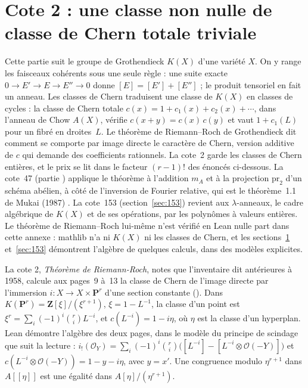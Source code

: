 \section[Cote 2 : une classe non nulle de classe de Chern totale triviale]{Cote 2 : une classe non nulle de classe de Chern totale triviale\protect{}}\label{sec:2}

Cette partie suit le groupe de Grothendieck $K(X)$ d'une variété $X$. On y range les faisceaux cohérents sous une seule règle : une suite exacte $0 \to E' \to E \to E'' \to 0$ donne $[E] = [E'] + [E'']$ ; le produit tensoriel en fait un anneau. Les classes de Chern traduisent une classe de $K(X)$ en classes de cycles : la classe de Chern totale $c(x) = 1 + c_1(x) + c_2(x) + \cdots$, dans l'anneau de Chow $A(X)$, vérifie $c(x + y) = c(x)\,c(y)$ et vaut $1 + c_1(L)$ pour un fibré en droites~$L$. Le théorème de Riemann--Roch de Grothendieck dit comment se comporte par image directe le caractère de Chern, version additive de $c$ qui demande des coefficients rationnels. La cote~2 garde les classes de Chern entières, et le prix se lit dans le facteur $(r-1)!$ des énoncés ci-dessous. La cote~47 (partie ) applique le théorème à l'addition $m_A$ et à la projection $\mathrm{pr}_2$ d'un schéma abélien, à côté de l'inversion de Fourier relative, qui est le théorème~1.1 de Mukai (1987) \cite{mukai1987}. La cote~153 (section~\ref{sec:153}) revient aux $\lambda$-anneaux, le cadre algébrique de $K(X)$ et de ses opérations, par les polynômes à valeurs entières. Le théorème de Riemann--Roch lui-même n'est vérifié en Lean nulle part dans cette annexe : mathlib n'a ni $K(X)$ ni les classes de Chern, et les sections~\ref{sec:2} et~\ref{sec:153} démontrent l'algèbre de quelques calculs, dans des modèles explicites.

La cote 2, \emph{Théorème de Riemann-Roch}, notes que l'inventaire dit antérieures à 1958, calcule aux pages~9 à~13 la classe de Chern de l'image directe par l'immersion $i : X \to X \times \mathbf P^r$ d'une section constante (). Dans $K(\mathbf P^r) = \mathbf Z[\xi]/(\xi^{r+1})$, $\xi = 1 - L^{-1}$, la classe d'un point est $\xi^r = \sum_i (-1)^i \binom ri L^{-i}$, et $c(L^{-i}) = 1 - i\eta$, où $\eta$ est la classe d'un hyperplan. Lean démontre l'algèbre des deux pages, dans le modèle du principe de scindage que suit la lecture : $i_!(\mathcal O_Y) = \sum_i (-1)^i\binom ri\bigl([L^{-i}] - [L^{-i} \otimes \mathcal O(-Y)]\bigr)$ et $c(L^{-i} \otimes \mathcal O(-Y)) = 1 - y - i\eta$, avec $y = x'$. Une congruence modulo $\eta^{r+1}$ dans $A[[\eta]]$ est une égalité dans $A[\eta]/(\eta^{r+1})$.

